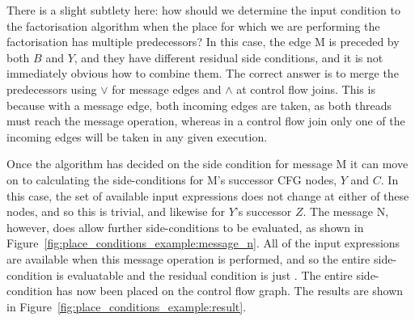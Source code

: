 There is a slight subtlety here: how should we determine the input
condition to the factorisation algorithm when the place for which we
are performing the factorisation has multiple predecessors?  In this
case, the edge M is preceded by both $B$ and $Y$, and they have
different residual side conditions, and it is not immediately obvious
how to combine them.  The correct answer is to merge the predecessors
using $\vee$ for message edges and $\wedge$ at control flow joins.
This is because with a message edge, both incoming edges are taken, as
both threads must reach the message operation, whereas in a control
flow join only one of the incoming edges will be taken in any given
execution.

Once the algorithm has decided on the side condition for message M it
can move on to calculating the side-conditions for M's successor CFG
nodes, $Y$ and $C$.  In this case, the set of available input
expressions does not change at either of these nodes, and so this is
trivial, and likewise for $Y$'s successor $Z$.  The message N,
however, does allow further side-conditions to be evaluated, as shown
in Figure~\ref{fig:place_conditions_example:message_n}.  All of the
input expressions are available when this message operation is
performed, and so the entire side-condition is evaluatable and the
residual condition is just \true.  The entire side-condition has now
been placed on the control flow graph.  The results are shown in
Figure~\ref{fig:place_conditions_example:result}.

